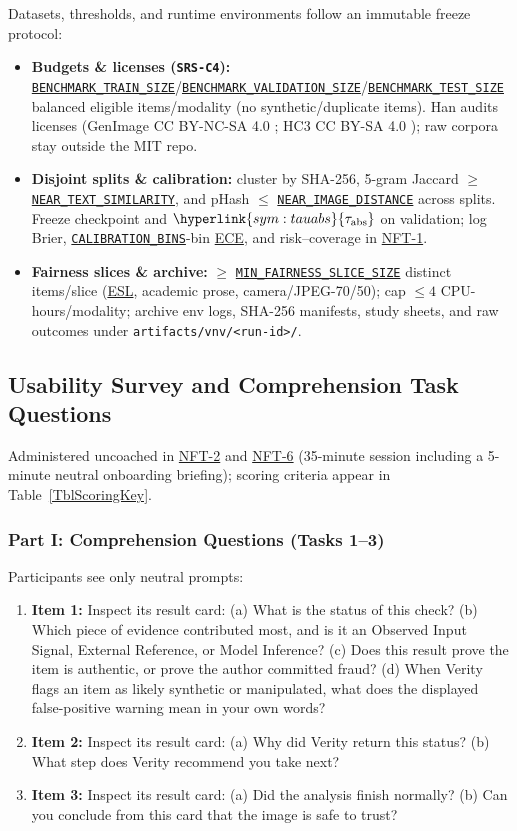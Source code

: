 \documentclass[12pt, titlepage]{article}
\newcommand{\BenchmarkTrainSize}{\hyperref[const:BENCHMARK_TRAIN_SIZE]{\texttt{BENCHMARK\_\allowbreak{}TRAIN\_\allowbreak{}SIZE}}}
\newcommand{\BenchmarkValidationSize}{\hyperref[const:BENCHMARK_VALIDATION_SIZE]{\texttt{BENCHMARK\_\allowbreak{}VALIDATION\_\allowbreak{}SIZE}}}
\newcommand{\BenchmarkTestSize}{\hyperref[const:BENCHMARK_TEST_SIZE]{\texttt{BENCHMARK\_\allowbreak{}TEST\_\allowbreak{}SIZE}}}
\newcommand{\MinFairnessSliceSize}{\hyperref[const:MIN_FAIRNESS_SLICE_SIZE]{\texttt{MIN\_\allowbreak{}FAIRNESS\_\allowbreak{}SLICE\_\allowbreak{}SIZE}}}
\newcommand{\NearTextSimilarity}{\hyperref[const:NEAR_TEXT_SIMILARITY]{\texttt{NEAR\_\allowbreak{}TEXT\_\allowbreak{}SIMILARITY}}}
\newcommand{\NearImageDistance}{\hyperref[const:NEAR_IMAGE_DISTANCE]{\texttt{NEAR\_\allowbreak{}IMAGE\_\allowbreak{}DISTANCE}}}
\newcommand{\CalibrationBins}{\hyperref[const:CALIBRATION_BINS]{\texttt{CALIBRATION\_\allowbreak{}BINS}}}
\newcommand{\SymTauAbs}{\hyperlink{sym:tauabs}{\tau_{\text{abs}}}}
\newcommand{\ECE}{\hyperlink{vnv-acr-ece}{ECE}}
\newcommand{\ESL}{\hyperlink{vnv-acr-esl}{ESL}}
\begin{document}
Datasets, thresholds, and runtime environments follow an immutable freeze protocol:
\begin{itemize}[leftmargin=*, itemsep=0.5pt, topsep=2pt]
    \item \textbf{Budgets \& licenses (\texttt{SRS-C4}):} \BenchmarkTrainSize{}/\BenchmarkValidationSize{}/\BenchmarkTestSize{} balanced eligible items/modality (no synthetic/duplicate items). Han audits licenses (GenImage CC BY-NC-SA 4.0 \cite{GenImageLicense}; HC3 CC BY-SA 4.0 \cite{HC3License}); raw corpora stay outside the MIT repo.
    \item \textbf{Disjoint splits \& calibration:} cluster by SHA-256, 5-gram Jaccard $\ge$ \NearTextSimilarity{}, and pHash $\le$ \NearImageDistance{} across splits. Freeze checkpoint and $\SymTauAbs$ on validation; log Brier, \CalibrationBins{}-bin \ECE{}, and risk--coverage in \hyperref[test:NFT-1]{NFT-1}.
    \item \textbf{Fairness slices \& archive:} $\ge$ \MinFairnessSliceSize{} distinct items/slice (\ESL{}, academic prose, camera/JPEG-70/50); cap $\le 4$ CPU-hours/modality; archive env logs, SHA-256 manifests, study sheets, and raw outcomes under \texttt{artifacts/\allowbreak{}vnv/<run-id>/}.
\end{itemize}

\subsection{Usability Survey and Comprehension Task Questions}\label{subsec:usability-survey}

Administered uncoached in \hyperref[test:NFT-2]{NFT-2} and \hyperref[test:NFT-6]{NFT-6} (35-minute session including a 5-minute neutral onboarding briefing); scoring criteria appear in Table~\ref{TblScoringKey}.

\subsubsection*{Part I: Comprehension Questions (Tasks 1--3)}
Participants see only neutral prompts:
\begin{enumerate}[leftmargin=*, itemsep=0.5pt, topsep=2pt, label=\textbf{C\arabic*.}]
    \item \textbf{Item 1:} Inspect its result card: (a) What is the status of this check? (b) Which piece of evidence contributed most, and is it an Observed Input Signal, External Reference, or Model Inference? (c) Does this result prove the item is authentic, or prove the author committed fraud? (d) When Verity flags an item as likely synthetic or manipulated, what does the displayed false-positive warning mean in your own words?
    \item \textbf{Item 2:} Inspect its result card: (a) Why did Verity return this status? (b) What step does Verity recommend you take next?
    \item \textbf{Item 3:} Inspect its result card: (a) Did the analysis finish normally? (b) Can you conclude from this card that the image is safe to trust?
\end{enumerate}
\end{document}
